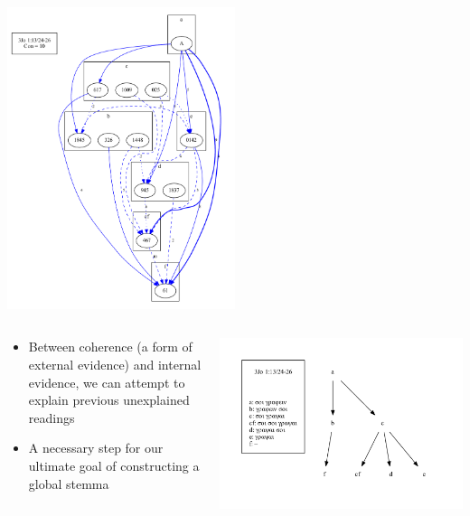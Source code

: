 \documentclass[10pt]{beamer}
\begin{document}
	\begin{frame}
		\begin{center}
			\includegraphics[width=0.5\textwidth]{../img/B25K1V13U24-26-coherence-variants-strengths.pdf}
		\end{center}
	\end{frame}
	\begin{frame}
		\begin{columns}
			\begin{column}{0.45\textwidth}
				\begin{itemize}
					\item Between coherence (a form of external evidence) and internal evidence, we can attempt to explain previous unexplained readings
					\item A necessary step for our ultimate goal of constructing a global stemma
				\end{itemize}
			\end{column}
			\begin{column}{0.45\textwidth}
				\begin{center}
					\includegraphics[width=\textwidth]{../img/B25K1V13U24-26-local-stemma-complete.pdf}
				\end{center}
			\end{column}
		\end{columns}
	\end{frame}
\end{document}
